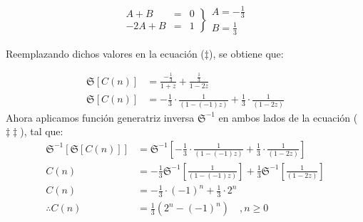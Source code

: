\begin{solution}
$$
  \left.
    \begin{array}{rcr}
       A + B &=&0\\
      -2A + B &=& 1
      \end{array}
  \right\}
  \begin{array}{l}
       A= -\frac{1}{3}  \\
       B= \frac{1}{3}
  \end{array}
$$

Reemplazando dichos valores en la ecuación ($\ddagger$), se obtiene que:

\begin{align*}
    \mathfrak{S}\left[ C(n) \right] &= \frac{-\frac{1}{3}}{1+z} + \frac{\frac{1}{3}}{1-2z}\\
    \mathfrak{S}\left[ C(n) \right] &= -\frac{1}{3}\cdot \frac{1}{(1-(-1)z)} + \frac{1}{3}\cdot\frac{1}{(1-2z)} \tag{$\ddagger\ddagger$}
\end{align*}
Ahora aplicamos función generatriz inversa $\mathfrak{S}^{-1}$ en ambos lados de la ecuación ($\ddagger\ddagger$), tal que:
\begin{align*}
    \mathfrak{S}^{-1}\left[ \mathfrak{S}\left[ C(n) \right] \right] &= \mathfrak{S}^{-1}\left[ -\frac{1}{3}\cdot \frac{1}{(1-(-1)z)} + \frac{1}{3}\cdot\frac{1}{(1-2z)} \right] \\
    C(n) &= -\frac{1}{3}\mathfrak{S}^{-1}\left[\frac{1}{(1-(-1)z)} \right] + \frac{1}{3}\mathfrak{S}^{-1}\left[\frac{1}{(1-2z)} \right]\\
    C(n)&=-\frac{1}{3}\cdot(-1)^{n} + \frac{1}{3}\cdot 2^n \\
    \therefore C(n) &= \frac{1}{3}\left(2^n -(-1)^n\right)\quad, n\ge0
\end{align*}
\end{solution}